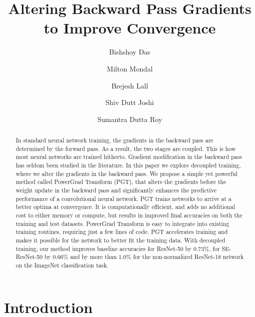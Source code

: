 \documentclass[runningheads]{llncs}
\begin{document}
\title{Altering Backward Pass Gradients\\ to Improve Convergence}
\author{Bishshoy Das\and Milton Mondal\and Brejesh Lall\and Shiv Dutt Joshi\and Sumantra Dutta Roy}
\maketitle


\begin{abstract}
In standard neural network training, the gradients in the backward pass are determined
by the forward pass. As a result, the two stages are coupled. This is how most neural
networks are trained hitherto. Gradient modification in the backward pass has seldom
been studied in the literature. In this paper we explore decoupled training, where we
alter the gradients in the backward pass. We propose a simple yet powerful method called
PowerGrad Transform (PGT), that alters the gradients before the weight update in the
backward pass and significantly enhances the predictive performance of a convolutional
neural network. PGT trains networks to arrive at a better optima at convergence. It is
computationally efficient, and adds no additional cost to either memory or compute, but
results in improved final accuracies on both the training and test datasets. PowerGrad
Transform is easy to integrate into existing training routines, requiring just a few
lines of code. PGT accelerates training and makes it possible for the network to better
fit the training data. With decoupled training, our method improves baseline accuracies
for ResNet-50 by 0.73\%, for SE-ResNet-50 by 0.66\% and by more than 1.0\% for the
non-normalized ResNet-18 network on the ImageNet classification task.
\end{abstract}

\section{Introduction}
\label{sec:Intr}
\end{document}
